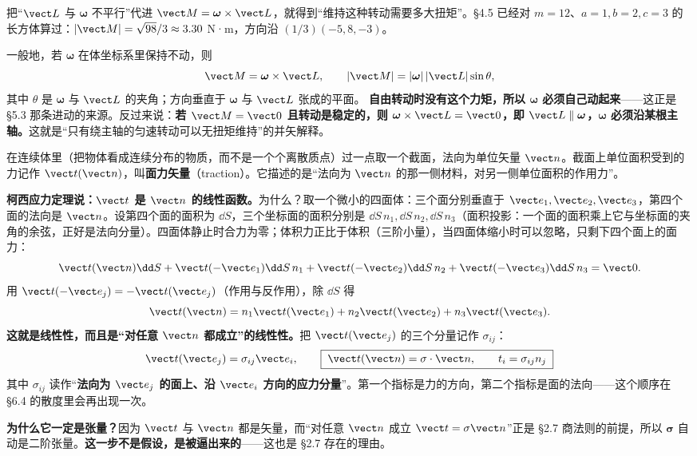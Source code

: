 \documentclass[11pt]{ctexart}
\newcommand{\ten}[1]{\mathbf{#1}}
\let\orighdr\hdr
\renewcommand{\hdr}[2]{\par\needspace{10\baselineskip}\orighdr{#1}{#2}}
\let\origsubhdr\subhdr
\renewcommand{\subhdr}[1]{\par\needspace{3\baselineskip}\origsubhdr{#1}}
\begin{document}
把“$\vect L$ 与 $\boldsymbol\omega$ 不平行”代进 $\vect M=\boldsymbol\omega\times\vect L$，就得到“维持这种转动需要多大扭矩”。§4.5 已经对 $m=12$、$a=1,b=2,c=3$ 的长方体算过：$|\vect M|=\sqrt{98}/3\approx3.30$ N·m，方向沿 $(1/3)(-5,8,-3)$。

一般地，若 $\boldsymbol\omega$ 在体坐标系里保持不动，则
\[
\vect M=\boldsymbol\omega\times\vect L,\qquad
|\vect M|=|\boldsymbol\omega|\,|\vect L|\sin\theta,
\]
其中 $\theta$ 是 $\boldsymbol\omega$ 与 $\vect L$ 的夹角；方向垂直于 $\boldsymbol\omega$ 与 $\vect L$ 张成的平面。
\textbf{自由转动时没有这个力矩，所以 $\boldsymbol\omega$ 必须自己动起来}——这正是 §5.3 那条进动的来源。反过来说：\textbf{若 $\vect M=\vect0$ 且转动是稳定的，则 $\boldsymbol\omega\times\vect L=\vect0$，即 $\vect L\parallel\boldsymbol\omega$，$\boldsymbol\omega$ 必须沿某根主轴。}这就是“只有绕主轴的匀速转动可以无扭矩维持”的并矢解释。



在连续体里（把物体看成连续分布的物质，而不是一个个离散质点）过一点取一个截面，法向为单位矢量 $\vect n$。截面上单位面积受到的力记作 $\vect t(\vect n)$，叫\textbf{面力矢量}（traction）。它描述的是“法向为 $\vect n$ 的那一侧材料，对另一侧单位面积的作用力”。

\textbf{柯西应力定理说：$\vect t$ 是 $\vect n$ 的线性函数。}为什么？取一个微小的四面体：三个面分别垂直于 $\vect e_1,\vect e_2,\vect e_3$，第四个面的法向是 $\vect n$。设第四个面的面积为 $\dd S$，三个坐标面的面积分别是 $\dd S\,n_1,\dd S\,n_2,\dd S\,n_3$（面积投影：一个面的面积乘上它与坐标面的夹角的余弦，正好是法向分量）。四面体静止时合力为零；体积力正比于体积（三阶小量），当四面体缩小时可以忽略，只剩下四个面上的面力：
\[
\vect t(\vect n)\dd S+\vect t(-\vect e_1)\dd S\,n_1+\vect t(-\vect e_2)\dd S\,n_2+\vect t(-\vect e_3)\dd S\,n_3=\vect0 .
\]
用 $\vect t(-\vect e_j)=-\vect t(\vect e_j)$（作用与反作用），除 $\dd S$ 得
\[
\vect t(\vect n)=n_1\vect t(\vect e_1)+n_2\vect t(\vect e_2)+n_3\vect t(\vect e_3).
\]
\textbf{这就是线性性，而且是“对任意 $\vect n$ 都成立”的线性性。}把 $\vect t(\vect e_j)$ 的三个分量记作 $\sigma_{ij}$：
\[
\vect t(\vect e_j)=\sigma_{ij}\vect e_i,
\qquad
\boxed{\;\vect t(\vect n)=\ten\sigma\cdot\vect n,\qquad t_i=\sigma_{ij}n_j\;}
\]
其中 $\sigma_{ij}$ 读作“\textbf{法向为 $\vect e_j$ 的面上、沿 $\vect e_i$ 方向的应力分量}”。第一个指标是力的方向，第二个指标是面的法向——这个顺序在 §6.4 的散度里会再出现一次。

\textbf{为什么它一定是张量？}因为 $\vect t$ 与 $\vect n$ 都是矢量，而“对任意 $\vect n$ 成立 $\vect t=\ten\sigma\vect n$”正是 §2.7 商法则的前提，所以 $\ten\sigma$ 自动是二阶张量。\textbf{这一步不是假设，是被逼出来的}——这也是 §2.7 存在的理由。
\end{document}
